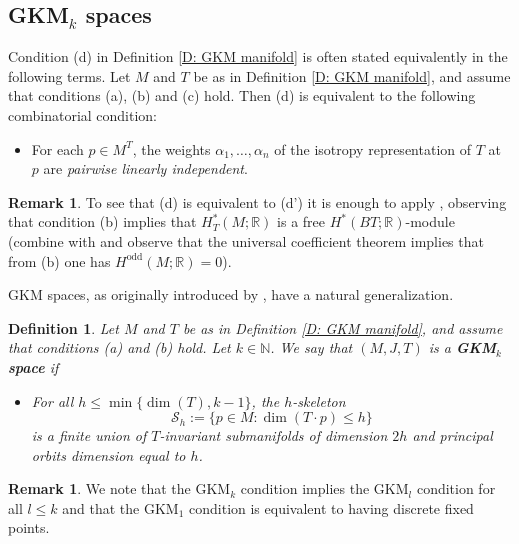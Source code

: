 \documentclass[12pt,a4paper]{amsart}
\newcommand{\RR}{\mathbb{R}}
\newcommand{\NN}{\mathbb{N}}
\theoremstyle{plain}
\newtheorem{defn}[thm]{Definition}
\theoremstyle{definition}
\newtheorem{rem}[thm]{Remark}
\begin{document}
\subsection{GKM$_k$ spaces}\label{GKMk}
Condition (d) in Definition \ref{D: GKM manifold} is often stated equivalently in the following terms.
Let $M$ and $T$ be as in Definition \ref{D: GKM manifold}, and assume that conditions (a), (b) and (c) hold. Then (d) is equivalent to the following combinatorial condition:
\begin{itemize}
\item[(d')] For each $p\in M^T$, the weights $\alpha_1,\ldots, \alpha_n$ of the isotropy representation of $T$ at $p$ are \emph{pairwise linearly independent}.
\end{itemize}
\begin{rem}\label{equivalence d and d'}
To see that (d) is equivalent to (d') it is enough to apply \cite[Theorem 11.8.1]{MR1689252}, observing that condition (b) implies that $H_T^*(M;\RR)$ is a free
$H^*(BT;\RR)$-module (combine \cite[Theorem 6.5.3]{MR1689252} with \cite[Theorem 6.6.2]{MR1689252} and observe that the universal coefficient theorem implies that from (b) one has $H^{\text{odd}}(M;\RR)=0$).
\end{rem}
GKM spaces, as originally introduced by \cite{MR1489894}, have a natural generalization.
\begin{defn}\label{gkm k def}
Let $M$ and $T$ be as in Definition \ref{D: GKM manifold}, and assume that conditions
(a) and (b) hold. 
Let $k\in \NN$. 
We say that $(M,J,T)$ is a \textbf{GKM$_k$ space} if
\begin{itemize}
\item [($\text{d}_k$)] For all $h\leq \min\{\dim(T),k-1\}$, the \emph{$h$-skeleton} $$\mathcal{S}_{h} := \{ p \in M \colon \dim(T \cdot p)
		\leq h\}$$ is a finite union of $T$-invariant submanifolds of dimension $2h$ and principal orbits dimension equal to $h$.
\end{itemize}
\end{defn}

\begin{rem}
We note that the GKM$_k$ condition implies the GKM$_l$ condition for all $l\leq k$ and that the GKM$_1$ condition is equivalent to having discrete fixed points.
\end{rem}
\end{document}
